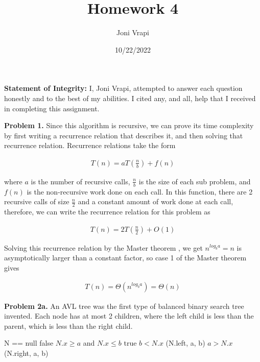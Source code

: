 \documentclass{article}
\title{Homework 4}
\author{Joni Vrapi}
\date{10/22/2022}
\begin{document}
\maketitle

\textbf{Statement of Integrity:} I, Joni Vrapi, attempted to answer each question honestly and to the best of my abilities. I cited any, and all, help that I received in completing this assignment.

\hfill

\textbf{Problem 1.} Since this algorithm is recursive, we can prove its time complexity by first writing a recurrence relation that describes it, and then solving that recurrence relation. Recurrence relations take the form 

\begin{gather}
    T(n) = aT(\frac{n}{b}) + f(n)
\end{gather}

where $a$ is the number of recursive calls, $\frac{n}{b}$ is the size of each sub problem, and $f(n)$ is the non-recursive work done on each call. In this function, there are 2 recursive calls of size $\frac{n}{2}$ and a constant amount of work done at each call, therefore, we  can write the recurrence relation for this problem as 

\begin{gather}
    T(n) = 2T(\frac{n}{2}) + O(1)
\end{gather}

Solving this recurrence relation by the Master theorem \cite{website:1}, we get $n^{log_b a} = n$ is asymptotically larger than a constant factor, so case 1 of the Master theorem gives

\begin{gather}
    T(n) = \Theta(n^{log_b a}) = \Theta(n)
\end{gather}

\hfill

\textbf{Problem 2a.} An AVL tree \cite{website:2} was the first type of balanced binary search tree invented. Each node has at most 2 children, where the left child is less than the parent, which is less than the right child. 

\begin{codebox}
    \li \If N == null \Then
    \li \Return false \End
    \li \If $N.x \geq a$ and $N.x \leq b$ \Then
    \li \Return true
    \li \Else 
    \li \If $b < N.x$ \Then
    \li \Return {}(N.left, a, b) \End
    \li \If $a > N.x$ \Then
    \li \Return {}(N.right, a, b) \End
    \li \End
\end{codebox}
\end{document}
